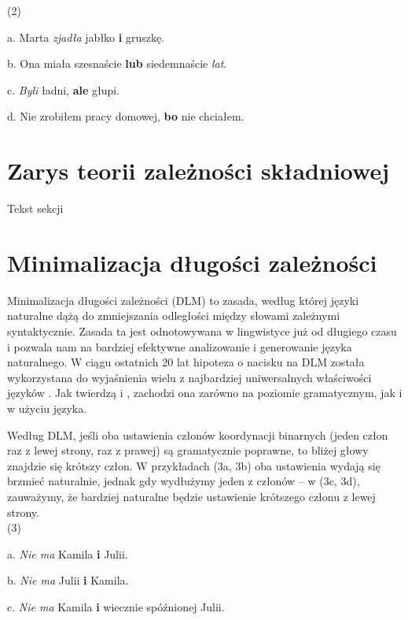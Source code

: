 \documentclass[licencjacka]{pracamgr_Kogni}
\begin{document}
(2)

a. Marta \textit{zjadła} jabłko \textbf{i} gruszkę.

b. Ona miała szesnaście \textbf{lub} siedemnaście \textit{lat}.

c. \textit{Byli} ładni, \textbf{ale} głupi.

d. Nie zrobiłem pracy domowej, \textbf{bo} nie chciałem.

\section{Zarys teorii zależności składniowej}
Tekst sekcji

\section{Minimalizacja długości zależności}
Minimalizacja długości zależności (DLM) to zasada, według której języki naturalne dążą do zmniejszania odległości między słowami zależnymi syntaktycznie. Zasada ta jest odnotowywana w lingwistyce już od długiego czasu i pozwala nam na bardziej efektywne analizowanie i generowanie języka naturalnego. W ciągu ostatnich 20 lat hipoteza o nacisku na DLM została wykorzystana do wyjaśnienia wielu z najbardziej uniwersalnych właściwości języków \citep{FutrellEtAl2015}.
Jak twierdzą \citet{Hawkins1994} i \citet{FutrellEtAl2020}, zachodzi ona zarówno na poziomie gramatycznym, jak i w użyciu języka.

Według DLM, jeśli oba ustawienia członów koordynacji binarnych (jeden człon raz z lewej strony, raz z prawej) są gramatycznie poprawne, to bliżej głowy znajdzie się krótszy człon. W przykładach (3a, 3b) oba ustawienia wydają się brzmieć naturalnie, jednak gdy wydłużymy jeden z członów -- w (3c, 3d), zauważymy, że bardziej naturalne będzie ustawienie krótszego członu z lewej strony.
\\

(3)

a. \textit{Nie ma} Kamila \textbf{i} Julii.

b. \textit{Nie ma} Julii \textbf{i} Kamila.

c. \textit{Nie ma} Kamila \textbf{i} wiecznie spóźnionej Julii.
\end{document}
